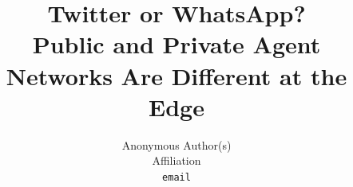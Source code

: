 \documentclass{article}
\title{Twitter or WhatsApp? \\
  Public and Private Agent Networks Are Different at the Edge}
\author{%
  Anonymous Author(s) \\
  Affiliation \\
  \texttt{email} \\
}
\begin{document}
\maketitle

\begin{abstract}

\end{abstract}













% 

\appendix






\end{document}
